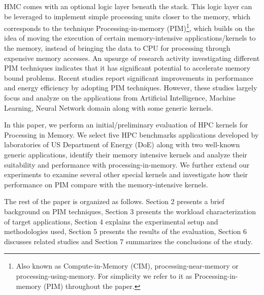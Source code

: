 HMC comes with an optional logic layer beneath the stack. This logic layer can be leveraged to implement simple processing units closer to the memory, which corresponds to the technique Processing-in-memory (PIM)\footnote{Also known as Compute-in-Memory (CIM), processing-near-memory or processing-using-memory. For simplicity we refer to it as Processing-in-memory (PIM) throughout the paper.}, which builds on the idea of moving the execution of certain memory-intensive applications/kernels to the memory, instead of bringing the data to CPU for processing through expensive memory accesses. An upsurge of research activity investigating different PIM techniques indicates that it has significant potential to accelerate memory bound problems. Recent studies report significant improvements in performance and energy efficiency by adopting PIM techniques. However, these studies largely focus and analyze on the applications from Artificial Intelligence, Machine Learning, Neural Network domain along with some generic kernels. 

In this paper, we perform an initial/preliminary evaluation of HPC kernels for Processing in Memory. We select five HPC benchmarks applications developed by laboratories of US Department of Energy (DoE) along with two well-known generic applications, identify their memory intensive kernels and analyze their suitability and performance with processing-in-memory. We further extend our experiments to examine several other special kernels and investigate how their performance on PIM compare with the memory-intensive kernels.   

The rest of the paper is organized as follows. Section 2 presents a brief background on PIM techniques, Section 3 presents the workload characterization of target applications, Section 4 explains the experimental setup and methodologies used, Section 5 presents the results of the evaluation, Section 6 discusses related studies and Section 7 summarizes the conclusions of the study.   
